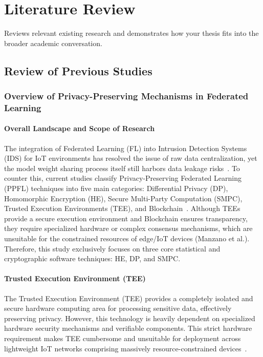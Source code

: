 \chapter{Literature Review}
Reviews relevant existing research and demonstrates how your thesis fits into the broader academic conversation.
\section{Review of Previous Studies}

\subsection{Overview of Privacy-Preserving Mechanisms in Federated Learning}

\subsubsection*{Overall Landscape and Scope of Research}
The integration of Federated Learning (FL) into Intrusion Detection Systems (IDS) for IoT environments has resolved the issue of raw data centralization, yet the model weight sharing process itself still harbors data leakage risks~\cite{vyas2024}. To counter this, current studies classify Privacy-Preserving Federated Learning (PPFL) techniques into five main categories: Differential Privacy (DP), Homomorphic Encryption (HE), Secure Multi-Party Computation (SMPC), Trusted Execution Environments (TEE), and Blockchain~\cite{vyas2024}. Although TEEs provide a secure execution environment and Blockchain ensures transparency, they require specialized hardware or complex consensus mechanisms, which are unsuitable for the constrained resources of edge/IoT devices (Manzano et al.). Therefore, this study exclusively focuses on three core statistical and cryptographic software techniques: HE, DP, and SMPC.

\subsubsection*{Trusted Execution Environment (TEE)}
The Trusted Execution Environment (TEE) provides a completely isolated and secure hardware computing area for processing sensitive data, effectively preserving privacy. However, this technology is heavily dependent on specialized hardware security mechanisms and verifiable components. This strict hardware requirement makes TEE cumbersome and unsuitable for deployment across lightweight IoT networks comprising massively resource-constrained devices~\cite{vyas2024}.

